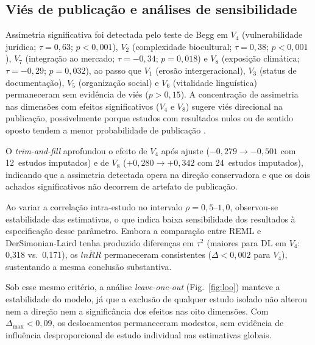 \documentclass[12pt,a4paper]{article}
\begin{document}
\subsection{Viés de publicação e análises de sensibilidade}
\label{sec:bias-sensitivity}

Assimetria significativa foi detectada pelo teste de Begg em $V_4$ (vulnerabilidade jurídica; $\tau = 0{,}63$; $p < 0{,}001$), $V_2$ (complexidade biocultural; $\tau = 0{,}38$; $p < 0{,}001$), $V_7$ (integração ao mercado; $\tau = -0{,}34$; $p = 0{,}018$) e $V_8$ (exposição climática; $\tau = -0{,}29$; $p = 0{,}032$), ao passo que $V_1$ (erosão intergeracional), $V_3$ (status de documentação), $V_5$ (organização social) e $V_6$ (vitalidade linguística) permaneceram sem evidência de viés ($p > 0{,}15$). A concentração de assimetria nas dimensões com efeitos significativos ($V_4$ e $V_8$) sugere viés direcional na publicação, possivelmente porque estudos com resultados nulos ou de sentido oposto tendem a menor probabilidade de publicação \citep{Song2010}.

O \textit{trim-and-fill} aprofundou o efeito de $V_4$ após ajuste ($-0{,}279 \to -0{,}501$ com 12~estudos imputados) e de $V_8$ ($+0{,}280 \to +0{,}342$ com 24~estudos imputados), indicando que a assimetria detectada opera na direção conservadora e que os dois achados significativos não decorrem de artefato de publicação.

Ao variar a correlação intra-estudo no intervalo $\rho = 0{,}5\text{--}1{,}0$, observou-se estabilidade das estimativas, o que indica baixa sensibilidade dos resultados à especificação desse parâmetro. Embora a comparação entre REML e DerSimonian-Laird tenha produzido diferenças em $\tau^2$ (maiores para DL em $V_4$: 0,318 vs.\ 0,171), os $\overline{lnRR}$ permaneceram consistentes ($\Delta < 0{,}002$ para $V_4$), sustentando a mesma conclusão substantiva.

Sob esse mesmo critério, a análise \textit{leave-one-out} (Fig.~\ref{fig:loo}) manteve a estabilidade do modelo, já que a exclusão de qualquer estudo isolado não alterou nem a direção nem a significância dos efeitos nas oito dimensões. Com $\Delta_{\max} < 0{,}09$, os deslocamentos permaneceram modestos, sem evidência de influência desproporcional de estudo individual nas estimativas globais.
\end{document}
